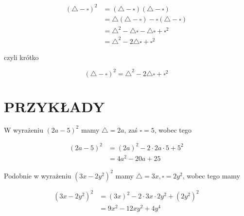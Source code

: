 \documentclass[10pt]{article}
\begin{document}
\[
\begin{aligned}
(\triangle-\square)^{2} & =(\triangle-\square)(\triangle-\square) \\
& =\triangle(\triangle-\square)-\square(\triangle-\square) \\
& =\triangle^{2}-\triangle \square-\triangle \square+\square^{2} \\
& =\triangle^{2}-2 \triangle \square+\square^{2}
\end{aligned}
\]

czyli krótko

\[
(\triangle-\square)^{2}=\triangle^{2}-2 \triangle \square+\square^{2}
\]

\section*{PRZYKŁADY}
W wyrażeniu \((2 a-5)^{2}\) mamy \(\triangle=2 a\), zaś \(\square=5\), wobec tego

\[
\begin{aligned}
(2 a-5)^{2} & =(2 a)^{2}-2 \cdot 2 a \cdot 5+5^{2} \\
& =4 a^{2}-20 a+25
\end{aligned}
\]

Podobnie w wyrażeniu \(\left(3 x-2 y^{2}\right)^{2}\) mamy \(\triangle=3 x, \square=2 y^{2}\), wobec tego mamy

\[
\begin{aligned}
\left(3 x-2 y^{2}\right)^{2} & =(3 x)^{2}-2 \cdot 3 x \cdot 2 y^{2}+\left(2 y^{2}\right)^{2} \\
& =9 x^{2}-12 x y^{2}+4 y^{4}
\end{aligned}
\]
\end{document}

